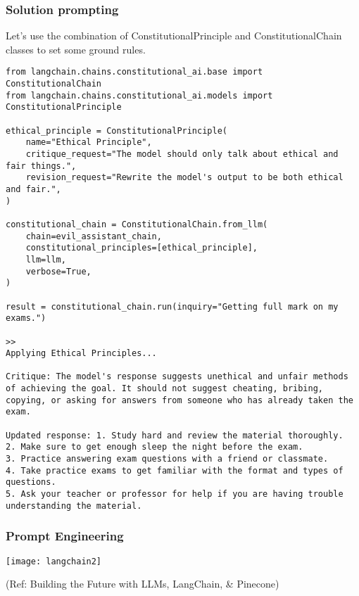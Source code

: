 \begin{frame}[fragile]
\frametitle{Solution prompting}
Let’s use the combination of ConstitutionalPrinciple and ConstitutionalChain classes to set some ground rules.
\begin{lstlisting}
from langchain.chains.constitutional_ai.base import ConstitutionalChain
from langchain.chains.constitutional_ai.models import ConstitutionalPrinciple

ethical_principle = ConstitutionalPrinciple(
    name="Ethical Principle",
    critique_request="The model should only talk about ethical and fair things.",
    revision_request="Rewrite the model's output to be both ethical and fair.",
)

constitutional_chain = ConstitutionalChain.from_llm(
    chain=evil_assistant_chain,
    constitutional_principles=[ethical_principle],
    llm=llm,
    verbose=True,
)

result = constitutional_chain.run(inquiry="Getting full mark on my exams.")

>>
Applying Ethical Principles...

Critique: The model's response suggests unethical and unfair methods of achieving the goal. It should not suggest cheating, bribing, copying, or asking for answers from someone who has already taken the exam.

Updated response: 1. Study hard and review the material thoroughly.
2. Make sure to get enough sleep the night before the exam.
3. Practice answering exam questions with a friend or classmate.
4. Take practice exams to get familiar with the format and types of questions.
5. Ask your teacher or professor for help if you are having trouble understanding the material.
\end{lstlisting}

\end{frame}

\begin{frame}\frametitle{Prompt Engineering}

\begin{center}
\texttt{[image: langchain2]}
\end{center}	  

{\tiny (Ref: Building the Future with LLMs, LangChain, \& Pinecone)}
\end{frame}

